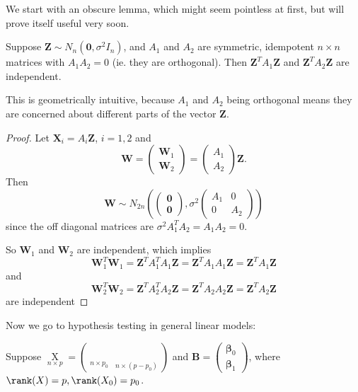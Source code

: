 \documentclass[a4paper]{article}
\begin{document}
We start with an obscure lemma, which might seem pointless at first, but will prove itself useful very soon.
\begin{lemma}
  Suppose $\mathbf{Z} \sim N_n(\mathbf{0}, \sigma^2 I_n)$, and $A_1$ and $A_2$ are symmetric, idempotent $n\times n$ matrices with $A_1A_2 = 0$ (ie. they are orthogonal). Then $\mathbf{Z}^T A_1 \mathbf{Z}$ and $\mathbf{Z}^TA_2 \mathbf{Z}$ are independent.
\end{lemma}
This is geometrically intuitive, because $A_1$ and $A_2$ being orthogonal means they are concerned about different parts of the vector $\mathbf{Z}$.

\begin{proof}
  Let $\mathbf{X}_i = A_i \mathbf{Z}$, $i = 1, 2$ and
  \[
    \mathbf{W} =
    \begin{pmatrix}
      \mathbf{W}_1\\
      \mathbf{W}_2
    \end{pmatrix} = \begin{pmatrix} A_1\\ A_2\end{pmatrix}\mathbf{Z}.
  \]
  Then
  \[
    \mathbf{W}\sim N_{2n}\left(
    \begin{pmatrix}
      \mathbf{0}\\
      \mathbf{0}
    \end{pmatrix}, \sigma^2
    \begin{pmatrix}
      A_1 & 0\\
      0 & A_2
    \end{pmatrix}\right)
  \]
  since the off diagonal matrices are $\sigma^2 A_1^TA_2 = A_1A_2 = 0$.

  So $\mathbf{W}_1$ and $\mathbf{W}_2$ are independent, which implies
  \[
    \mathbf{W}_1^T \mathbf{W}_1 = \mathbf{Z}^TA_1^TA_1 \mathbf{Z} = \mathbf{Z}^T A_1A_1 \mathbf{Z} = \mathbf{Z}^T A_1 \mathbf{Z}
  \]
  and
  \[
    \mathbf{W}_2^T \mathbf{W}_2 = \mathbf{Z}^TA_2^TA_2 \mathbf{Z} = \mathbf{Z}^T A_2A_2 \mathbf{Z} = \mathbf{Z}^T A_2 \mathbf{Z}
  \]
  are independent
\end{proof}
Now we go to hypothesis testing in general linear models:

Suppose $\mathop{X}\limits_{n \times p} = \left(\mathop{X_0}\limits_{n \times p_0}\, \mathop{X_1}\limits_{n \times (p - p_0)}\right)$ and $\mathbf{B} = \begin{pmatrix}\boldsymbol\beta_0 \\ \boldsymbol\beta_1\end{pmatrix}$, where $\rank (X) = p, \rank(X_0) = p_0$.
\end{document}
